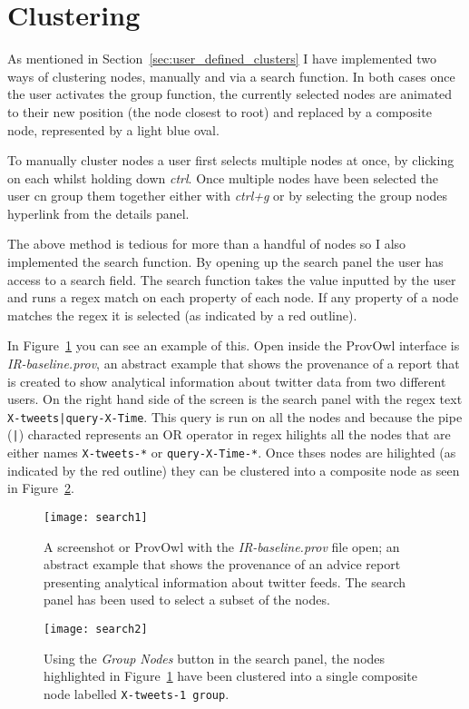 \section{Clustering}
\label{sec:clustering}

As mentioned in Section~\ref{sec:user_defined_clusters} I have implemented two ways of clustering nodes, manually and via a search function. In both cases once the user activates the group function, the currently selected nodes are animated to their new position (the node closest to root) and replaced by a composite node, represented by a light blue oval. 

To manually cluster nodes a user first selects multiple nodes at once, by clicking on each whilst holding down \textit{ctrl}. Once multiple nodes have been selected the user cn group them together either with \textit{ctrl+g} or by selecting the group nodes hyperlink from the details panel.

The above method is tedious for more than a handful of nodes so I also implemented the search function. By opening up the search panel the user has access to a search field. The search function takes the value inputted by the user and runs a regex match on each property of each node. If any property of a node matches the regex it is selected (as indicated by a red outline).

In Figure~\ref{fig:search1} you can see an example of this. Open inside the ProvOwl interface is \textit{IR-baseline.prov}, an abstract example that shows the provenance of a report that is created to show analytical information about twitter data from two different users. On the right hand side of the screen is the search panel with the regex text \texttt{X-tweets|query-X-Time}. This query is run on all the nodes and because the pipe (\texttt{|}) characted represents an OR operator in regex hilights all the nodes that are either names \texttt{X-tweets-*} or \texttt{query-X-Time-*}. Once thses nodes are hilighted (as indicated by the red outline) they can be clustered into a composite node as seen in Figure~\ref{fig:search2}.


\begin{figure}[h]
	\centering
	\texttt{[image: search1]}
	\caption{A screenshot or ProvOwl with the \textit{IR-baseline.prov} file open; an abstract example that shows the provenance of an advice report presenting analytical information about twitter feeds. The search panel has been used to select a subset of the nodes.}
	\label{fig:search1}
\end{figure}
\begin{figure}[h]
	\centering
	\texttt{[image: search2]}
	\caption{Using the \textit{Group Nodes} button in the search panel, the nodes highlighted in Figure~\ref{fig:search1} have been clustered into a single composite node labelled \texttt{X-tweets-1 group}.}
	\label{fig:search2}
\end{figure}

